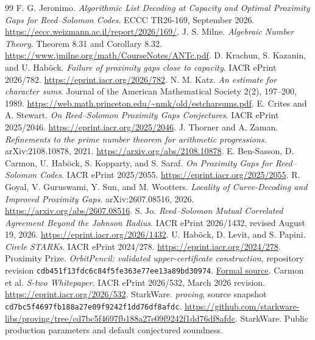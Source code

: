 \documentclass[11pt,letterpaper]{article}
\theoremstyle{definition}
\theoremstyle{remark}
\begin{document}
\begin{thebibliography}{99}
 F. G. Jeronimo.
\emph{Algorithmic List Decoding at Capacity and Optimal Proximity Gaps for Reed--Solomon Codes}.
ECCC TR26-169, September 2026.
\url{https://eccc.weizmann.ac.il/report/2026/169/}.
 J. S. Milne. \emph{Algebraic Number Theory}.
Theorem 8.31 and Corollary 8.32.
\url{https://www.jmilne.org/math/CourseNotes/ANTc.pdf}.
 D. Krachun, S. Kazanin, and U. Hab\"ock.
\emph{Failure of proximity gaps close to capacity}.
IACR ePrint 2026/782. \url{https://eprint.iacr.org/2026/782}.
 N. M. Katz.
\emph{An estimate for character sums}.
Journal of the American Mathematical Society 2(2), 197--200, 1989.
\url{https://web.math.princeton.edu/~nmk/old/estcharsums.pdf}.
 E. Crites and A. Stewart.
\emph{On Reed--Solomon Proximity Gaps Conjectures}.
IACR ePrint 2025/2046. \url{https://eprint.iacr.org/2025/2046}.
 J. Thorner and A. Zaman.
\emph{Refinements to the prime number theorem for arithmetic progressions}.
arXiv:2108.10878, 2021.
\url{https://arxiv.org/abs/2108.10878}.
 E. Ben-Sasson, D. Carmon, U. Hab\"ock, S. Kopparty,
and S. Saraf. \emph{On Proximity Gaps for Reed--Solomon Codes}.
IACR ePrint 2025/2055. \url{https://eprint.iacr.org/2025/2055}.
 R. Goyal, V. Guruswami, Y. Sun, and M. Wootters.
\emph{Locality of Curve-Decoding and Improved Proximity Gaps}.
arXiv:2607.08516, 2026.\quad
\url{https://arxiv.org/abs/2607.08516}.
 S. Jo.
\emph{Reed--Solomon Mutual Correlated Agreement Beyond the Johnson Radius}.
IACR ePrint 2026/1432, revised August 19, 2026.
\url{https://eprint.iacr.org/2026/1432}.
 U. Hab\"ock, D. Levit, and S. Papini.
\emph{Circle STARKs}.
IACR ePrint 2024/278. \url{https://eprint.iacr.org/2024/278}.
 Proximity Prize.
\emph{OrbitPencil: validated upper-certificate construction},
repository revision \nolinkurl{cdb451f13fdc6c84f5fe363e77ee13a89bd30974}.
\href{https://github.com/proximity-prize/proximity-prize/blob/cdb451f13fdc6c84f5fe363e77ee13a89bd30974/ProximityPrize/SubmissionUpper/OrbitPencil.lean}{Formal source}.
 Carmon et al. \emph{S-two Whitepaper}.
IACR ePrint 2026/532, March 2026 revision.
\url{https://eprint.iacr.org/2026/532}.
 StarkWare. \emph{proving}, source snapshot
\nolinkurl{cd7bc5f4697fb188a27e09f9242f1dd76df8afdc}.
\url{https://github.com/starkware-libs/proving/tree/cd7bc5f4697fb188a27e09f9242f1dd76df8afdc}.
 StarkWare. Public production parameters and
default conjectured soundness.

\end{thebibliography}
\end{document}
